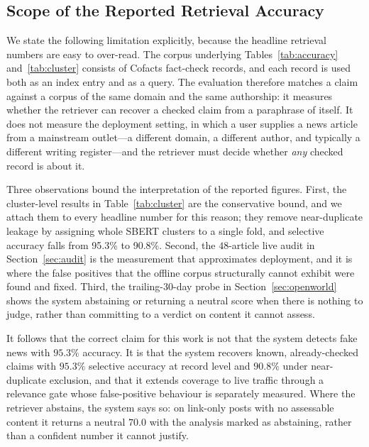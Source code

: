 \documentclass[twoside]{llncs}
\begin{document}
\subsection{Scope of the Reported Retrieval Accuracy}
\label{sec:caveat}
We state the following limitation explicitly, because the headline retrieval numbers are easy to over-read. The corpus underlying Tables~\ref{tab:accuracy} and~\ref{tab:cluster} consists of Cofacts fact-check records, and each record is used both as an index entry and as a query. The evaluation therefore matches a claim against a corpus of the same domain and the same authorship: it measures whether the retriever can recover a checked claim from a paraphrase of itself. It does not measure the deployment setting, in which a user supplies a news article from a mainstream outlet---a different domain, a different author, and typically a different writing register---and the retriever must decide whether \emph{any} checked record is about it.

Three observations bound the interpretation of the reported figures. First, the cluster-level results in Table~\ref{tab:cluster} are the conservative bound, and we attach them to every headline number for this reason; they remove near-duplicate leakage by assigning whole SBERT clusters to a single fold, and selective accuracy falls from 95.3\% to 90.8\%. Second, the $48$-article live audit in Section~\ref{sec:audit} is the measurement that approximates deployment, and it is where the false positives that the offline corpus structurally cannot exhibit were found and fixed. Third, the trailing-30-day probe in Section~\ref{sec:openworld} shows the system abstaining or returning a neutral score when there is nothing to judge, rather than committing to a verdict on content it cannot assess.

It follows that the correct claim for this work is not that the system detects fake news with $95.3\%$ accuracy. It is that the system recovers known, already-checked claims with $95.3\%$ selective accuracy at record level and $90.8\%$ under near-duplicate exclusion, and that it extends coverage to live traffic through a relevance gate whose false-positive behaviour is separately measured. Where the retriever abstains, the system says so: on link-only posts with no assessable content it returns a neutral $70.0$ with the analysis marked as abstaining, rather than a confident number it cannot justify.
\end{document}

